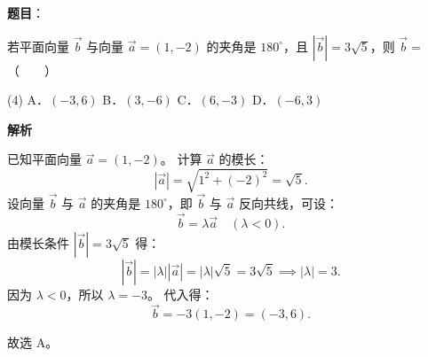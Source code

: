 \begin{answer}

\textbf{题目}：

若平面向量 $\vec{b}$ 与向量 $\vec{a} = (1, -2)$ 的夹角是 $180^\circ$，且 $|\vec{b}| = 3\sqrt{5}$，则 $\vec{b} =$\mbox{（　　）}

\begin{gkopts}(4)
\task A．$(-3, 6)$
\task B．$(3, -6)$
\task C．$(6, -3)$
\task D．$(-6, 3)$
\end{gkopts}

\textbf{解析}

已知平面向量 $\vec{a} = (1, -2)$。
计算 $\vec{a}$ 的模长：
\nopagebreak[4]
\[
|\vec{a}| = \sqrt{1^2 + (-2)^2} = \sqrt{5}.
\]
设向量 $\vec{b}$ 与 $\vec{a}$ 的夹角是 $180^\circ$，即 $\vec{b}$ 与 $\vec{a}$ 反向共线，可设：
\nopagebreak[4]
\[
\vec{b} = \lambda \vec{a} \quad (\lambda < 0).
\]
由模长条件 $|\vec{b}| = 3\sqrt{5}$ 得：
\nopagebreak[4]
\[
|\vec{b}| = |\lambda||\vec{a}| = |\lambda|\sqrt{5} = 3\sqrt{5} \implies |\lambda| = 3.
\]
因为 $\lambda < 0$，所以 $\lambda = -3$。
代入得：
\nopagebreak[4]
\[
\vec{b} = -3(1, -2) = (-3, 6).
\]

故选 A。


\end{answer}
